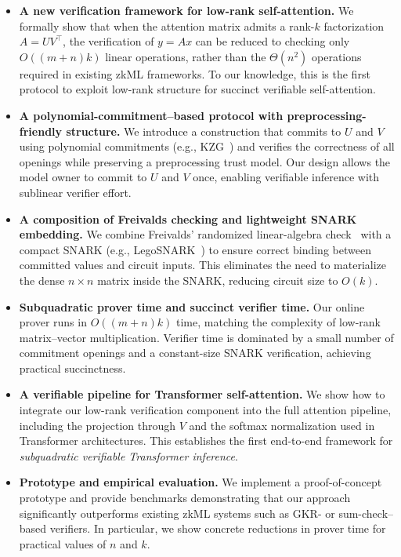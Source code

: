 \documentclass[11pt]{article}
\begin{document}
\begin{itemize}[leftmargin=2em]

  \item \textbf{A new verification framework for low-rank self-attention.}  
  We formally show that when the attention matrix admits a 
  rank-$k$ factorization $A = U V^\top$, the verification of 
  $y = A x$ can be reduced to checking only 
  $O((m+n)k)$ linear operations, rather than the $\Theta(n^2)$ 
  operations required in existing zkML frameworks.
  To our knowledge, this is the first protocol to exploit 
  low-rank structure for succinct verifiable self-attention.

  \item \textbf{A polynomial-commitment–based protocol with 
  preprocessing-friendly structure.}  
  We introduce a construction that commits to $U$ and $V$ using 
  polynomial commitments (e.g., KZG~\cite{kate2010polynomial}) and verifies
  the correctness of all openings while preserving a preprocessing 
  trust model.  
  Our design allows the model owner to commit to $U$ and $V$ once,
  enabling verifiable inference with sublinear verifier effort.

  \item \textbf{A composition of Freivalds checking and lightweight SNARK embedding.}  
  We combine Freivalds' randomized linear-algebra check~\cite{freivalds1979fast}
  with a compact SNARK (e.g., LegoSNARK~\cite{campanelli2019legosnark}) 
  to ensure correct binding between committed values and circuit inputs.
  This eliminates the need to materialize the dense $n \times n$ matrix 
  inside the SNARK, reducing circuit size to $O(k)$.

  \item \textbf{Subquadratic prover time and succinct verifier time.}  
  Our online prover runs in $O((m+n)k)$ time, matching the complexity 
  of low-rank matrix–vector multiplication.
  Verifier time is dominated by a small number of commitment openings 
  and a constant-size SNARK verification, achieving practical succinctness.

  \item \textbf{A verifiable pipeline for Transformer self-attention.}  
  We show how to integrate our low-rank verification component into 
  the full attention pipeline, including the projection through $V$ 
  and the softmax normalization used in Transformer architectures.  
  This establishes the first end-to-end framework for 
  \emph{subquadratic verifiable Transformer inference}.

  \item \textbf{Prototype and empirical evaluation.}  
  We implement a proof-of-concept prototype and provide benchmarks 
  demonstrating that our approach significantly outperforms existing 
  zkML systems such as GKR- or sum-check–based verifiers.  
  In particular, we show concrete reductions in prover time for 
  practical values of $n$ and $k$.

\end{itemize}
\end{document}
